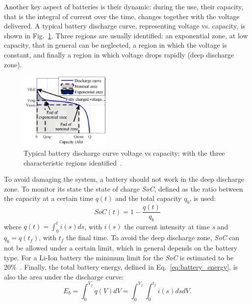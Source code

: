 Another key aspect of batteries is their dynamic: during the use, their capacity, that is the integral of current over the time, changes together with the voltage delivered.
A typical battery discharge curve, representing voltage vs. capacity, is shown in Fig.~\ref{fig:discarghe_battery}.
Three regions are usually identified: an exponential zone, at low capacity, that in general can be neglected, a region in which the voltage is constant, and finally a region in which voltage drops rapidly (deep discharge zone).
\begin{figure}[!h]
	\centering
	\includegraphics[keepaspectratio, width=0.4\textwidth]{images/chap3/battery_discharge_curve.jpg}
	\caption{Typical battery discharge curve voltage vs capacity; with the three characteristic regions identified~\cite{bib:tremblay}.}
	\label{fig:discarghe_battery}
\end{figure}

To avoid damaging the system, a battery should not work in the deep discharge zone. 
To monitor its state the state of charge \textit{SoC}, defined as the ratio between the capacity at a certain time $q\left(t\right)$ and the total capacity $q_b$, is used:
\begin{equation}
\label{eq:soc_orig}
SoC\left(t\right) = 1 - \frac{q\left(t\right)}{q_{b}}
\end{equation}
where $q\left(t\right)=\int_{0}^{t} i\left(s\right)ds$, with $i\left(s\right)$ the current intensity at time \textit{s} and $q_b=q(t_f)$, with $t_f$ the final time.
To avoid the deep discharge zone, \textit{SoC} can not be allowed under a certain limit, which in general depends on the battery type.
For a Li-Ion battery the minimum limit for the \textit{SoC} is estimated to be 20\%~\cite{bib:lowry, bib:tremblay}.
Finally, the total battery energy, defined in Eq.~\eqref{eq:battery_energy}, is also the area under the discharge curve:
\begin{equation}
\label{eq:battery_energy_int}
E_b = \int_{0}^{V_{f}}q\left(V\right)dV = \int_{0}^{V_{f}} \int_{0}^{t_{f}}i\left(s\right)dsdV.
\end{equation}

